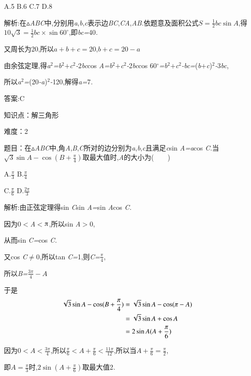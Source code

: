\documentclass{article} %
\begin{document}
 A.5 B.6 C.7 D.8

 解析:在$\mathrm{\vartriangle}$\textit{ABC}中,分别用\textit{a},\textit{b},\textit{c}表示边\textit{BC},\textit{CA},\textit{AB.}依题意及面积公式$S=\frac{1}{2}bc\sin A$,得$10\sqrt{3}=\frac{1}{2}bc\times\sin 60^\circ$,即\textit{bc=}40\textit{.}

又周长为20,所以$a+b+c=20$,$b+c=20-a$

由余弦定理,得\textit{a}${}^{2}$\textit{=b}${}^{2}$\textit{$+$c}${}^{2}$\textit{-}2\textit{bc}cos \textit{A=b}${}^{2}$\textit{$+$c}${}^{2}$\textit{-}2\textit{bc}cos 60$\mathrm{{}^\circ}$\textit{=b}${}^{2}$\textit{$+$c}${}^{2}$\textit{-bc=}(\textit{b$+$c})${}^{2}$\textit{-}3\textit{bc},

所以\textit{a}${}^{2}$\textit{=}(20\textit{-a})${}^{2}$\textit{-}120,解得\textit{a=}7\textit{.}

 答案:C

知识点：解三角形

难度：2

 题目：在$\mathrm{\vartriangle}$\textit{ABC}中,角\textit{A},\textit{B},\textit{C}所对的边分别为\textit{a},\textit{b},\textit{c}且满足\textit{c}sin \textit{A=a}cos \textit{C.}当$\sqrt{3}\sin A-\cos (B+\frac{\pi}{4})$取最大值时,\textit{A}的大小为(\textit{　　})

 A.$\frac{\pi}{3}$ B.$\frac{\pi}{4}$

 C.$\frac{\pi}{6}$ D.$\frac{2\pi}{3}$

 解析:由正弦定理得sin \textit{C}sin \textit{A=}sin \textit{A}cos \textit{C.}

因为0\textit{$<$A$<$}$\piup$,所以sin \textit{A$>$}0,

从而sin \textit{C=}cos \textit{C.}

又cos \textit{C}$\mathrm{\neq}$0,所以tan \textit{C=}1,则\textit{C=}$\frac{\pi}{4}$,

所以\textit{B=}$\frac{3\pi}{4}-A$

于是
\begin{align}
\notag
\sqrt{3}\sin A-\cos (B+\frac{\pi}{4})&=\sqrt{3}\sin A-\cos (\pi-A)\\\notag
&=\sqrt{3}\sin A+\cos A\\\notag
&=2\sin A(A+\frac{\pi}{6})
\end{align}


因为$0<A<\frac{3\pi}{4}$,所以$\frac{\pi}{6}<A+\frac{\pi}{6}<\frac{11\pi}{12}$,所以当$A+\frac{\pi}{6}=\frac{\pi}{2}$,

即$A=\frac{\pi}{3}$时,$2\sin (A+\frac{\pi}{6})$取最大值2\textit{.}
\end{document}
